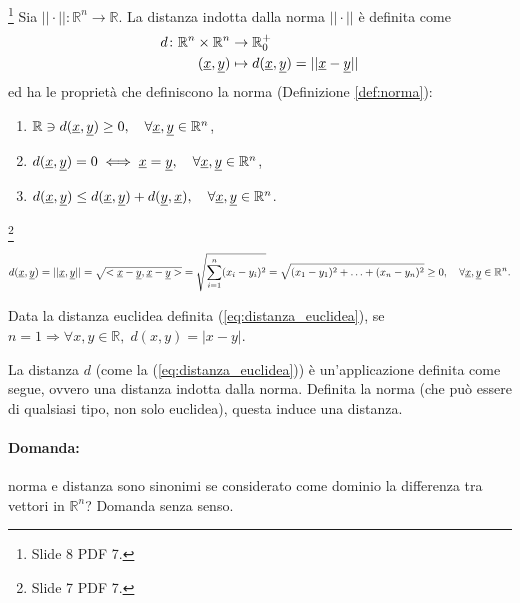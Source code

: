 \begin{definition}\footnote{Slide 8 PDF 7.}
    Sia $||\cdot||\colon\mathbb R^n\rightarrow\mathbb R$. La distanza indotta dalla norma $||\cdot||$ è definita come
    \begin{equation*}
        \begin{aligned}
            d\colon\mathbb R^n\times\mathbb R^n&\rightarrow\mathbb R^+_0\\
            (\uline x,\uline y)&\mapsto d(\uline x,\uline y)=||\uline x - \uline y||
        \end{aligned}
    \end{equation*}
    ed ha le proprietà che definiscono la norma (Definizione \ref{def:norma}):
    \begin{enumerate}
        \item $\mathbb R\ni d(\uline x, \uline y)\geq 0,\quad\forall\uline x,\uline y\in\mathbb R^n$,
        \item $d(\uline x,\uline y)=0\iff \uline x=\uline y,\quad\forall\uline x,\uline y\in\mathbb R^n$,
        \item $d(\uline x,\uline y)\leq d(\uline x,\uline y) +d(\uline y,\uline x),\quad\forall\uline x,\uline y\in\mathbb R^n$.
    \end{enumerate}
\end{definition}

\begin{definition}\footnote{Slide 7 PDF 7.}
    \begin{equation}\label{eq:distanza_euclidea}
        d(\uline x,\uline y)=||\uline x,\uline y||=\sqrt{<\uline x-\uline y, \uline x-\uline y>}=\sqrt{\sum_{i=1}^n(x_i-y_i)^2}=\sqrt{(x_1-y_1)^2+\hdots+(x_n-y_n)^2}\geq 0,\quad\forall\uline x,\uline y\in\mathbb R^n.
    \end{equation}
\end{definition}

\begin{remark}
    Data la distanza euclidea definita (\ref{eq:distanza_euclidea}), se $n=1\Rightarrow \forall x,y\in\mathbb R,\; d(x,y)=|x-y|$.
\end{remark}

La distanza $d$ (come la (\ref{eq:distanza_euclidea})) è un'applicazione definita come segue, ovvero una distanza indotta dalla norma. Definita la norma (che può essere di qualsiasi tipo, non solo euclidea), questa induce una distanza.

\paragraph{Domanda:} norma e distanza sono sinonimi se considerato come dominio la differenza tra vettori in $\mathbb R^n$? Domanda senza senso.

